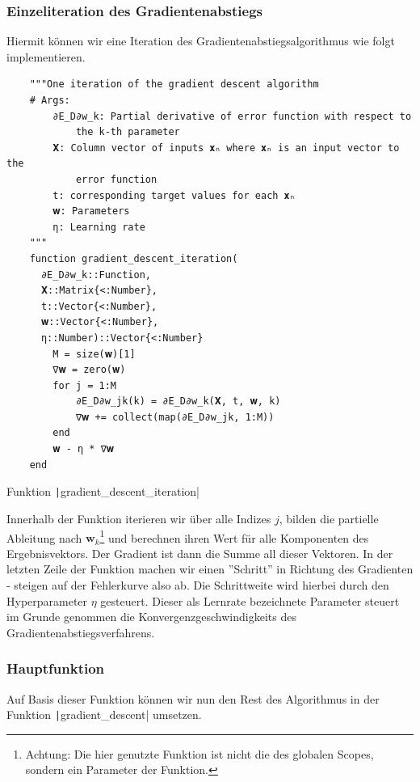 \documentclass{article}
\theoremstyle{plain} %
\theoremstyle{definition} %
\begin{document}
\subsubsection{Einzeliteration des Gradientenabstiegs}

Hiermit können wir eine Iteration des Gradientenabstiegsalgorithmus wie folgt implementieren.

\begin{listing}[H]
  \begin{verbatim} 
    """One iteration of the gradient descent algorithm
    # Args:
        ∂E_D∂w_k: Partial derivative of error function with respect to
            the k-th parameter
        𝐗: Column vector of inputs 𝐱ₙ where 𝐱ₙ is an input vector to the
            error function
        t: corresponding target values for each 𝐱ₙ
        𝐰: Parameters
        η: Learning rate
    """
    function gradient_descent_iteration(
      ∂E_D∂w_k::Function,
      𝐗::Matrix{<:Number},
      t::Vector{<:Number},
      𝐰::Vector{<:Number},
      η::Number)::Vector{<:Number}
        M = size(𝐰)[1]
        ∇𝐰 = zero(𝐰)
        for j = 1:M
            ∂E_D∂w_jk(k) = ∂E_D∂w_k(𝐗, t, 𝐰, k)
            ∇𝐰 += collect(map(∂E_D∂w_jk, 1:M))
        end
        𝐰 - η * ∇𝐰
    end
  \end{verbatim}
  \caption{Funktion \texttt|gradient_descent_iteration|}
  \label{listing:gd_iteration}
\end{listing}

Innerhalb der Funktion iterieren wir über alle Indizes $j$, bilden die partielle Ableitung nach $\mathbf{w}_k$\footnote{Achtung: Die hier genutzte Funktion ist nicht die des globalen Scopes, sondern ein Parameter der Funktion.} und berechnen ihren Wert für alle Komponenten des Ergebnisvektors. Der Gradient ist dann die Summe all dieser Vektoren. In der letzten Zeile der Funktion machen wir einen ''Schritt'' in Richtung des Gradienten - steigen auf der Fehlerkurve also ab. Die Schrittweite wird hierbei durch den Hyperparameter $\eta$ gesteuert. Dieser als Lernrate bezeichnete Parameter steuert im Grunde genommen die Konvergenzgeschwindigkeits des Gradientenabstiegsverfahrens.

\subsubsection{Hauptfunktion}

Auf Basis dieser Funktion können wir nun den Rest des Algorithmus in der Funktion \texttt|gradient_descent| umsetzen.
\end{document}
